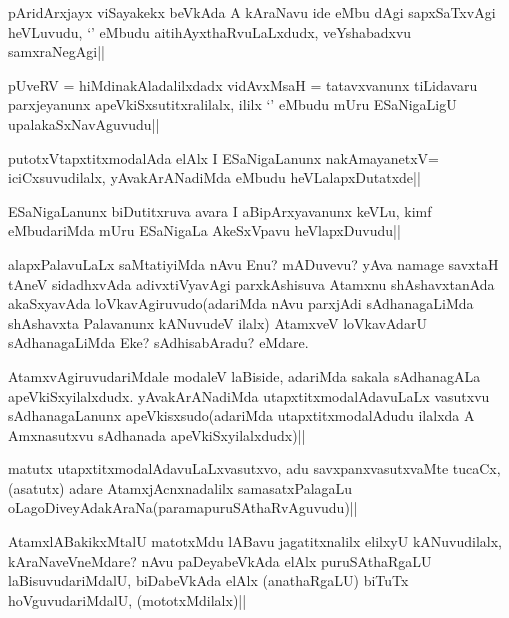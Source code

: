 \begin{artha}
pAridArxjayx viSayakekx beVkAda A kAraNavu ide eMbu dAgi sapxSaTxvAgi heVLuvudu, `\stext' eMbudu aitihAyxthaRvuLaLxdudx, veYshabadxvu samxraNegAgi||
\end{artha}

\begin{artha}
pUveRV = hiMdinakAladalilxdadx vidAvxMsaH = tatavxvanunx tiLidavaru parxjeyanunx apeVkiSxsutitxralilalx, ililx `\stext' eMbudu mUru ESaNigaLigU upalakaSxNavAguvudu||
\end{artha}

\begin{artha}
putotxVtapxtitxmodalAda elAlx I ESaNigaLanunx nakAmayanetxV= iciCxsuvudilalx, yAvakArANadiMda eMbudu heVLalapxDutatxde||
\end{artha}

\begin{artha}
ESaNigaLanunx biDutitxruva avara I aBipArxyavanunx keVLu, kimf  eMbudariMda mUru ESaNigaLa AkeSxVpavu heVlapxDuvudu||
\end{artha}

\begin{artha}
alapxPalavuLaLx saMtatiyiMda nAvu Enu? mADuvevu? yAva namage savxtaH tAneV sidadhxvAda adivxtiVyavAgi parxkAshisuva Atamxnu shAshavxtanAda akaSxyavAda loVkavAgiruvudo(adariMda nAvu parxjAdi sAdhanagaLiMda shAshavxta Palavanunx kANuvudeV ilalx) AtamxveV loVkavAdarU sAdhanagaLiMda Eke? sAdhisabAradu? eMdare.
\end{artha}

\begin{artha}
AtamxvAgiruvudariMdale modaleV laBiside, adariMda sakala sAdhanagALa apeVkiSxyilalxdudx. yAvakArANadiMda utapxtitxmodalAdavuLaLx vasutxvu sAdhanagaLanunx apeVkisxsudo(adariMda utapxtitxmodalAdudu ilalxda A Amxnasutxvu sAdhanada apeVkiSxyilalxdudx)||
\end{artha}

\begin{artha}
matutx utapxtitxmodalAdavuLaLxvasutxvo, adu savxpanxvasutxvaMte tucaCx, (asatutx) adare AtamxjAcnxnadalilx samasatxPalagaLu oLagoDiveyAdakAraNa(paramapuruSAthaRvAguvudu)||
\end{artha}


\begin{artha}
AtamxlABakikxMtalU matotxMdu lABavu jagatitxnalilx elilxyU kANuvudilalx, kAraNaveVneMdare? nAvu paDeyabeVkAda elAlx puruSAthaRgaLU laBisuvudariMdalU, biDabeVkAda elAlx (anathaRgaLU) biTuTx hoVguvudariMdalU, (mototxMdilalx)||
\end{artha}

